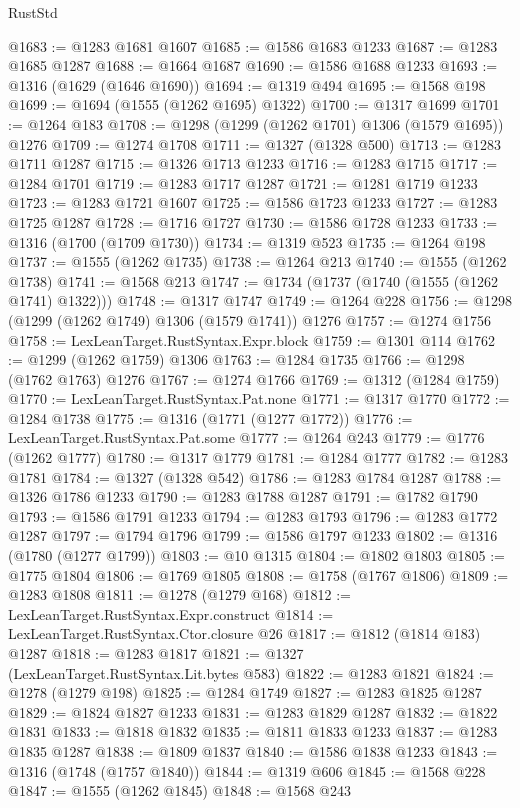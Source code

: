 \begin{lexlean}{RustStd}
\begin{coremodule}
@1683 := @1283 @1681 @1607
@1685 := @1586 @1683 @1233
@1687 := @1283 @1685 @1287
@1688 := @1664 @1687
@1690 := @1586 @1688 @1233
@1693 := @1316 (@1629 (@1646 @1690))
@1694 := @1319 @494
@1695 := @1568 @198
@1699 := @1694 (@1555 (@1262 @1695) @1322)
@1700 := @1317 @1699
@1701 := @1264 @183
@1708 := @1298 (@1299 (@1262 @1701) @1306 (@1579 @1695)) @1276
@1709 := @1274 @1708
@1711 := @1327 (@1328 @500)
@1713 := @1283 @1711 @1287
@1715 := @1326 @1713 @1233
@1716 := @1283 @1715
@1717 := @1284 @1701
@1719 := @1283 @1717 @1287
@1721 := @1281 @1719 @1233
@1723 := @1283 @1721 @1607
@1725 := @1586 @1723 @1233
@1727 := @1283 @1725 @1287
@1728 := @1716 @1727
@1730 := @1586 @1728 @1233
@1733 := @1316 (@1700 (@1709 @1730))
@1734 := @1319 @523
@1735 := @1264 @198
@1737 := @1555 (@1262 @1735)
@1738 := @1264 @213
@1740 := @1555 (@1262 @1738)
@1741 := @1568 @213
@1747 := @1734 (@1737 (@1740 (@1555 (@1262 @1741) @1322)))
@1748 := @1317 @1747
@1749 := @1264 @228
@1756 := @1298 (@1299 (@1262 @1749) @1306 (@1579 @1741)) @1276
@1757 := @1274 @1756
@1758 := LexLeanTarget.RustSyntax.Expr.block
@1759 := @1301 @114
@1762 := @1299 (@1262 @1759) @1306
@1763 := @1284 @1735
@1766 := @1298 (@1762 @1763) @1276
@1767 := @1274 @1766
@1769 := @1312 (@1284 @1759)
@1770 := LexLeanTarget.RustSyntax.Pat.none
@1771 := @1317 @1770
@1772 := @1284 @1738
@1775 := @1316 (@1771 (@1277 @1772))
@1776 := LexLeanTarget.RustSyntax.Pat.some
@1777 := @1264 @243
@1779 := @1776 (@1262 @1777)
@1780 := @1317 @1779
@1781 := @1284 @1777
@1782 := @1283 @1781
@1784 := @1327 (@1328 @542)
@1786 := @1283 @1784 @1287
@1788 := @1326 @1786 @1233
@1790 := @1283 @1788 @1287
@1791 := @1782 @1790
@1793 := @1586 @1791 @1233
@1794 := @1283 @1793
@1796 := @1283 @1772 @1287
@1797 := @1794 @1796
@1799 := @1586 @1797 @1233
@1802 := @1316 (@1780 (@1277 @1799))
@1803 := @10 @1315
@1804 := @1802 @1803
@1805 := @1775 @1804
@1806 := @1769 @1805
@1808 := @1758 (@1767 @1806)
@1809 := @1283 @1808
@1811 := @1278 (@1279 @168)
@1812 := LexLeanTarget.RustSyntax.Expr.construct
@1814 := LexLeanTarget.RustSyntax.Ctor.closure @26
@1817 := @1812 (@1814 @183) @1287
@1818 := @1283 @1817
@1821 := @1327 (LexLeanTarget.RustSyntax.Lit.bytes @583)
@1822 := @1283 @1821
@1824 := @1278 (@1279 @198)
@1825 := @1284 @1749
@1827 := @1283 @1825 @1287
@1829 := @1824 @1827 @1233
@1831 := @1283 @1829 @1287
@1832 := @1822 @1831
@1833 := @1818 @1832
@1835 := @1811 @1833 @1233
@1837 := @1283 @1835 @1287
@1838 := @1809 @1837
@1840 := @1586 @1838 @1233
@1843 := @1316 (@1748 (@1757 @1840))
@1844 := @1319 @606
@1845 := @1568 @228
@1847 := @1555 (@1262 @1845)
@1848 := @1568 @243

\end{coremodule}
\end{lexlean}
